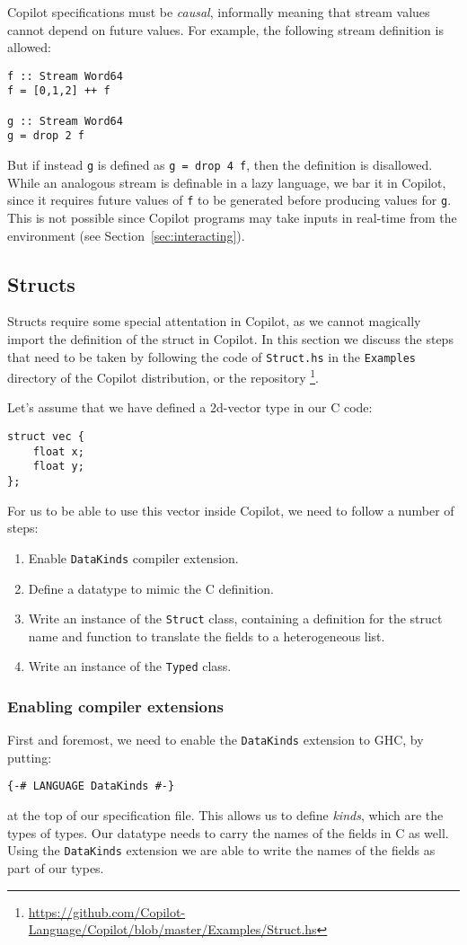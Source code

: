Copilot specifications must be \emph{causal}, informally meaning that
stream values cannot depend on future values.  For example, the following stream
definition is allowed:
%
\begin{lstlisting}[language = Copilot, frame = single]
f :: Stream Word64
f = [0,1,2] ++ f

g :: Stream Word64
g = drop 2 f
\end{lstlisting}
%

But if instead {\tt g} is defined as {\tt g = drop 4 f}, then the definition is
disallowed.  While an analogous stream is definable in a lazy language, we bar
it in Copilot, since it requires future values of {\tt f} to be
generated before producing values for {\tt g}.  This is not possible since
Copilot programs may take inputs in real-time from the environment (see
Section~\ref{sec:interacting}).


\subsection{Structs}
Structs require some special attentation in Copilot, as we cannot magically
import the definition of the struct in Copilot. In this section we discuss the
steps that need to be taken by following the code of \texttt{Struct.hs} in the
\texttt{Examples} directory of the Copilot distribution, or the repository
\footnote{\url{https://github.com/Copilot-Language/Copilot/blob/master/Examples/Struct.hs}}.

Let's assume that we have defined a 2d-vector type in our C code:
\begin{lstlisting}
struct vec {
	float x;
	float y;
};
\end{lstlisting}
For us to be able to use this vector inside Copilot, we need to follow a number
of steps:
\begin{enumerate}
  \item Enable \texttt{DataKinds} compiler extension.
  \item Define a datatype to mimic the C definition.
  \item Write an instance of the \texttt{Struct} class, containing a definition
  for the struct name and function to translate the fields to a heterogeneous
    list.
  \item Write an instance of the \texttt{Typed} class.
\end{enumerate}

\subsubsection*{Enabling compiler extensions}
First and foremost, we need to enable the \texttt{DataKinds} extension to GHC,
by putting:
\begin{lstlisting}[language=Copilot]
{-# LANGUAGE DataKinds #-}
\end{lstlisting}
at the top of our specification file. This allows us to define \emph{kinds},
which are the types of types. Our datatype needs to carry the names of the
fields in C as well. Using the \texttt{DataKinds} extension we are able to
write the names of the fields as part of our types.


